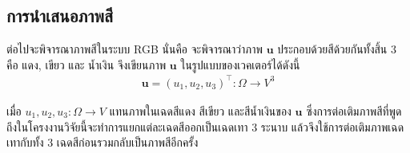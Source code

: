 \subsection{การนำเสนอภาพสี}

\hspace{1cm} ต่อไปจะพิจารณาภาพสีในระบบ RGB นั่นคือ จะพิจารณาว่าภาพ $\boldsymbol{u}$ ประกอบด้วยสีด้วยกันทั้งสิ้น 3 คือ แดง, เขียว และ น้ำเงิน จึงเขียนภาพ $\boldsymbol{u}$  ในรูปแบบของเวคเตอร์ได้ดังนี้
\begin{align*}
	\boldsymbol{u} = (u_1,u_2,u_3)^{\top} : \Omega  \rightarrow V^3	
\end{align*}

\noindent เมื่อ $u_1,u_2,u_3: \Omega  \rightarrow V$ แทนภาพในเฉดสีแดง สีเขียว และสีน้ำเงินของ $\boldsymbol{u}$ ซึ่งการต่อเติมภาพสีที่พูดถึงในโครงงานวิจัยนี้จะทำการแยกแต่ละเฉดสีออกเป็นเฉดเทา 3 ระนาบ แล้วจึงใช้การต่อเติมภาพเฉดเทากับทั้ง 3 เฉดสีก่อนรวมกลับเป็นภาพสีอีกครั้ง
